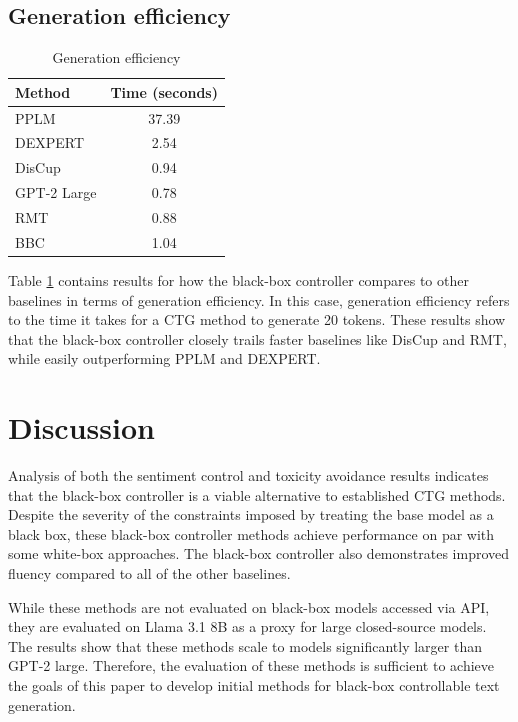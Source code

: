 \documentclass[phd,electronic,oneside,twosidetoc,letterpaper,chaptercenter,parttop,lof]{byumsphd}
\begin{document}
\subsection{Generation efficiency}

\begin{table}[t]
  \centering
  \small
  \begin{tabular}{lc}
    \toprule
    \textbf{Method} & \textbf{Time (seconds)} \\
    \midrule
    PPLM & 37.39 \\
    DEXPERT & 2.54 \\
    DisCup & 0.94 \\
    GPT-2 Large & 0.78 \\
    RMT & 0.88 \\
    BBC & 1.04 \\
    \bottomrule
  \end{tabular}
  \caption{Generation efficiency}
  \label{generation-efficiency}\vspace{12pt}
\end{table}

Table \ref{generation-efficiency} contains results for how the black-box controller compares to other baselines in terms of generation efficiency.
In this case, generation efficiency refers to the time it takes for a CTG method to generate 20 tokens.
These results show that the black-box controller closely trails faster baselines like DisCup and RMT, while easily outperforming PPLM and DEXPERT. 

\section{Discussion}
\label{discussion}

Analysis of both the sentiment control and toxicity avoidance results indicates that the black-box controller is a viable alternative to established CTG methods.
Despite the severity of the constraints imposed by treating the base model as a black box, these black-box controller methods achieve performance on par with some white-box approaches.
The black-box controller also demonstrates improved fluency compared to all of the other baselines. 

While these methods are not evaluated on black-box models accessed via API, they are evaluated on Llama 3.1 8B as a proxy for large closed-source models.
The results show that these methods scale to models significantly larger than GPT-2 large.
Therefore, the evaluation of these methods is sufficient to achieve the goals of this paper to develop initial methods for black-box controllable text generation.
\end{document}
